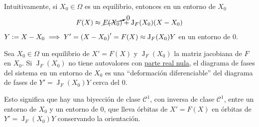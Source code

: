Intuitivamente, si $X_0 \in \Omega$ es un equilibrio, entonces en un entorno de $X_0$
\[F(X) \approx \cancelto{0}{F(X_0)} + \operatorname{J}_F(X_0)(X-X_0)\]
$Y\vcentcolon= X-X_0\implies\displaystyle Y' = \left(X-X_0\right)' = F(X) \approx \operatorname{J}_F(X_0)Y$ en un entorno de $0$.

\begin{teo}
	Sea $X_0 \in \Omega$ un equilibrio de $X'=F(X)$ y $\operatorname{J}_F(X_0)$ la matriz jacobiana de $F$ en $X_0$. Si $\operatorname{J}_F(X_0)$ no tiene autovalores con \underline{parte real nula}, el diagrama de fases del sistema en un entorno de $X_0$ es una ``deformación diferenciable'' del diagrama de fases de $Y' = \operatorname{J}_F(X_0)Y$ cerca del 0.

	Esto significa que hay una biyección de clase $\mathcal{C}^1$, con inversa de clase $\mathcal{C}^1$, entre un entorno de $X_0$ y un entorno de 0, que lleva órbitas de $X'=F(X)$ en órbitas de $Y' = \operatorname{J}_F(X_0)Y$ conservando la orientación.
\end{teo}


